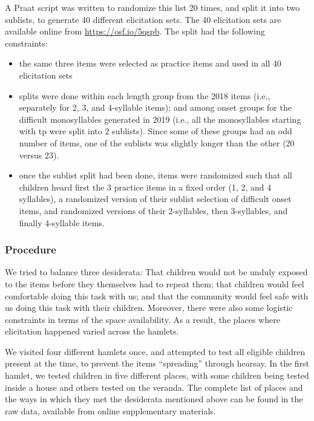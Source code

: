 \documentclass[english,,man,floatsintext]{apa6}
\providecommand{\tightlist}{%
  \setlength{\itemsep}{0pt}\setlength{\parskip}{0pt}}
\begin{document}
A Praat script was written to randomize this list 20 times, and split it
into two sublists, to generate 40 different elicitation sets. The 40
elicitation sets are available online from \url{https://osf.io/5qspb}.
The split had the following constraints:

\begin{itemize}
\tightlist
\item
  the same three items were selected as practice items and used in all
  40 elicitation sets
\item
  splits were done within each length group from the 2018 items (i.e.,
  separately for 2, 3, and 4-syllable items); and among onset groups for
  the difficult monosyllables generated in 2019 (i.e., all the
  monosyllables starting with tp were split into 2 sublists). Since some
  of these groups had an odd number of items, one of the sublists was
  slightly longer than the other (20 versus 23).
\item
  once the sublist split had been done, items were randomized such that
  all children heard first the 3 practice items in a fixed order (1, 2,
  and 4 syllables), a randomized version of their sublist selection of
  difficult onset items, and randomized versions of their 2-syllables,
  then 3-syllables, and finally 4-syllable items.
\end{itemize}

\subsubsection{Procedure}\label{procedure}

We tried to balance three desiderata: That children would not be unduly
exposed to the items before they themselves had to repeat them; that
children would feel comfortable doing this task with us; and that the
community would feel safe with us doing this task with their children.
Moreover, there were also some logistic constraints in terms of the
space availability. As a result, the places where elicitation happened
varied across the hamlets.

We visited four different hamlets once, and attempted to test all
eligible children present at the time, to prevent the items
\enquote{spreading} through hearsay. In the first hamlet, we tested
children in five different places, with some children being tested
inside a house and others tested on the veranda. The complete list of
places and the ways in which they met the desiderata mentioned above can
be found in the raw data, available from online supplementary materials.
\end{document}
